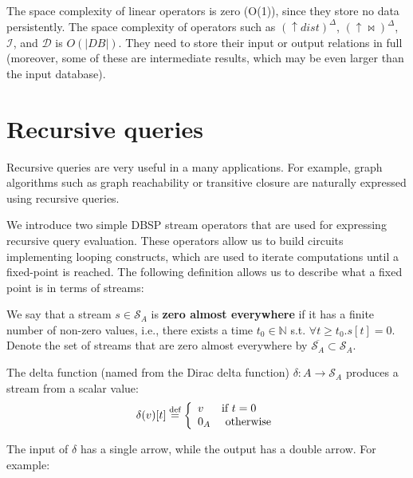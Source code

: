 \documentclass[twocolumn
]{svjour3}
\numberwithin{equation}{section}
\newcommand{\dbsp}{DBSP\xspace}
\newcommand{\defined}[1]{\textbf{#1}\index{}}
\newcommand{\N}{\mathbb{N}}  %
\newcommand{\stream}[1]{\ensuremath{\mathcal{S}_{#1}}}
\newcommand{\streamf}[1]{\ensuremath{\overline{\mathcal{S}_{#1}}}}
\newcommand{\I}{\mathcal{I}}  %
\newcommand{\D}{\mathcal{D}}  %
\newcommand{\I}{\mathit{I}}  %
\newcommand{\D}{\mathit{D}}  %
\newcommand{\inc}[1]{{#1}^{\Delta}}
\newcommand{\distinct}{\mathit{dist}}  %
\newcommand{\defn}{\stackrel{\textrm{\scriptsize def}}{=}}
\newcommand{\lift}[1]{{\uparrow}#1}
\newcommand{\sv}[1]{ %
\setsepchar{ }
\readlist\arg{#1}
\setlength\tabcolsep{4pt}
\begin{tabular}{|c|c|c|c|c|} \hline
  \!\ensuremath{\cdots}\! &
  \!\ensuremath{\arg[4]}\! &
  \!\ensuremath{\arg[3]}\! &
  \!\ensuremath{\arg[2]}\! &
  \!\ensuremath{\arg[1]}\!
  \\ \hline
\end{tabular}
}
\begin{document}
The space complexity of linear operators is zero (O(1)), since they
store no data persistently.  The space complexity of operators such as
$\inc{(\lift{\distinct})}$, $\inc{(\lift{\bowtie})}$, $\I$, and $\D$
is $O(|DB|)$.  They need to store their input or output relations in
full (moreover, some of these are intermediate results, which may be
even larger than the input database).

%
\section{Recursive queries}\label{sec:recursion}

Recursive queries are very useful in a many applications.
For example, graph algorithms such as graph reachability
or transitive closure are naturally expressed using recursive queries.

We introduce two simple \dbsp stream operators that are used for
expressing recursive query evaluation.  These operators allow us
to build circuits implementing looping constructs, which
are used to iterate computations until a fixed-point is reached.
The following definition allows us to describe what a fixed point is
in terms of streams:

\begin{definition}[zero a.e.]\label{def:zae}
We say that a stream $s \in \stream{A}$ is \defined{zero almost
  everywhere} if it has a finite number of non-zero values, i.e.,
there exists a time $t_0 \in \N$ s.t. $\forall t \geq t_0.s[t] = 0$.
\noindent Denote the set of streams that are zero almost everywhere
by $\streamf{A} \subset \stream{A}$.
\end{definition}

\begin{definition}  The delta function (named from the
Dirac delta function) $\delta : A \rightarrow \stream{A}$ produces a
stream from a scalar value:
$$\delta(v)[t] \defn \left\{
\begin{array}{ll}
  v & \mbox{if } t = 0 \\
  0_A & \mbox{ otherwise}
\end{array}
\right.
$$
\end{definition}

The input of $\delta$ has a single arrow, while the output has a
double arrow.  For example:

\begin{center}
\end{center}
\end{document}

